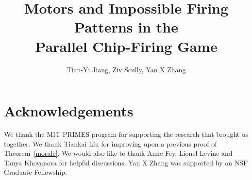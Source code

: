 \documentclass{siamltex}
\newlength{\figWidthA}
\newlength{\figWidthB}
\numberwithin{equation}{section}
\begin{document}
\setlength{}
\setlength{}

\title{Motors and Impossible
  Firing Patterns in the\\Parallel Chip-Firing Game}
\author{Tian-Yi Jiang, Ziv Scully, Yan X Zhang}
\pagestyle{myheadings}
\thispagestyle{plain}
\begin{abstract}

\end{abstract}
\maketitle

















\section*{Acknowledgements}
We thank the MIT PRIMES program for supporting the research that brought us
together. We thank Tiankai Liu for improving upon a previous proof of
Theorem~\ref{morale}. We would also like to thank Anne Fey, Lionel Levine and
Tanya Khovanova for helpful discussions. Yan X Zhang was supported by an NSF
Graduate Fellowship.



\end{document}
